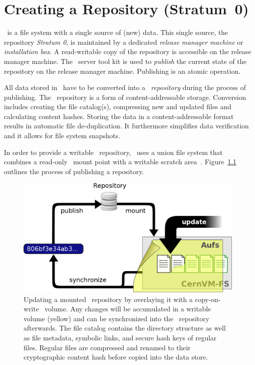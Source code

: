 \chapter{Creating a Repository (Stratum~0)}
\label{sct:createrepo}


\cvmfs\ is a file system with a single source of (new) data.
This single source, the repository \emph{Stratum 0}, is maintained by a dedicated \emph{release manager machine} or \emph{installation box}.
A read-writable copy of the repository is accessible on the release manager machine.
The \cvmfs\ server tool kit is used to \emph{publish} the current state of the repository on the release manager machine.
Publishing is an atomic operation.

All data stored in \cvmfs\ have to be converted into a \cvmfs\ \emph{repository} during the process of publishing.
The \cvmfs\ repository is a form of content-addressable storage.
Conversion includes creating the file catalog(s), compressing new and updated files and calculating content hashes.
Storing the data in a content-addressable format results in automatic file de-duplication.
It furthermore simplifies data verification and it allows for file system snapshots.

In order to provide a writable \cvmfs\ repository, \cvmfs\ uses a union file system that combines a read-only \cvmfs\ mount point with a writable scratch area~\cite{unionfs04,aufs}.
Figure~\ref{fig:installwebserver} outlines the process of publishing a repository.

\begin{figure}[h]
	\includegraphics[width=\textwidth]{figures/update_process.png}
	\caption{Updating a mounted \cvmfs\ repository by overlaying it with a copy-on-write \aufs\ volume.
		Any changes will be accumulated in a writable volume (yellow) and can be synchronized into the \cvmfs\ repository afterwards.
		The file catalog contains the directory structure as well as file metadata, symbolic links, and secure hash keys of regular files.
		Regular files are compressed and renamed to their cryptographic content hash before copied into the data store.}
	\label{fig:installwebserver}
\end{figure}

